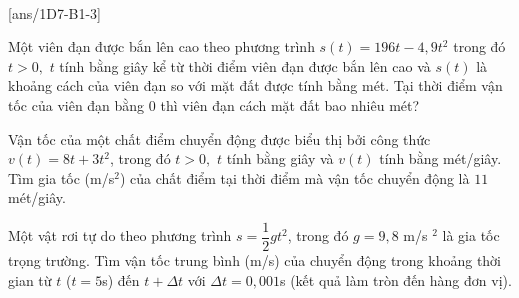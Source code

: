  \\
[ans/1D7-B1-3]
\begin{ex}%
	Một viên đạn được bắn lên cao theo phương trình $s(t)=196t-4{,}9t^2$ trong đó $t>0,$ $t$ tính bằng giây kể từ thời điểm viên đạn được bắn lên cao và $s(t)$ là khoảng cách của viên đạn so với mặt đất được tính bằng mét. Tại thời điểm vận tốc của viên đạn bằng $0$ thì viên đạn cách mặt đất bao nhiêu mét?\\
\end{ex}


\begin{ex}%
	Vận tốc của một chất điểm chuyển động được biểu thị bởi công thức $v(t)=8t+3t^2$, trong đó $t>0,$ $t$ tính bằng giây và $v(t)$ tính bằng mét/giây. Tìm gia tốc (m/s$^2$) của chất điểm tại thời điểm mà vận tốc chuyển động là $11$ mét/giây.\\
\end{ex}

\begin{ex}%
	Một vật rơi tự do theo phương trình $s=\dfrac{1}{2}gt^2$, trong đó $g=9{,}8$  m/s $^2$ là gia tốc trọng trường. Tìm vận tốc trung bình (m/s) của chuyển động trong khoảng thời gian từ  $t$ ($t=5$s) đến $t+\Delta t$ với $\Delta t=0{,}001$s (kết quả làm tròn đến hàng đơn vị).
	\\
\end{ex}

